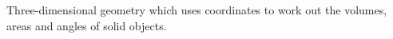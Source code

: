 Three-dimensional geometry which uses coordinates to work out the volumes, areas
and angles of solid objects.